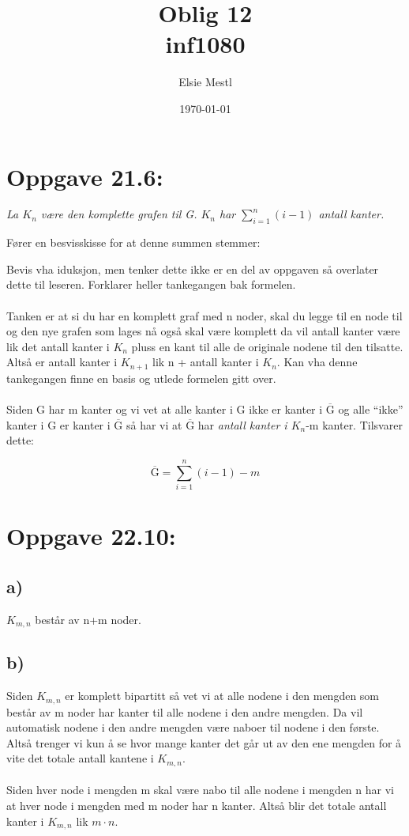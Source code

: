 \documentclass[a4paper, norsk, 10pt]{article}
\date{\today}
\title{Oblig 12 \\ inf1080}
\author{Elsie Mestl}
\begin{document}
\maketitle
\begin{flushleft}

  \section*{Oppgave 21.6:}

  
  \textit{La $K_{n}$ være den komplette grafen til G. $K_{n}$ har $\sum\limits_{i = 1}^{n} (i-1)$ antall kanter.}

  Fører en besvisskisse for at denne summen stemmer:

  Bevis vha iduksjon, men tenker dette ikke er en del av oppgaven så overlater dette til leseren. Forklarer heller tankegangen bak formelen.
\\ \ \\
  Tanken er at si du har en komplett graf med n noder, skal du legge til en node til og den nye grafen som lages nå også skal være komplett da vil antall kanter være lik det antall kanter i $K_{n}$ pluss en kant til alle de originale nodene til den tilsatte. Altså er antall kanter i $K_{n+1}$ lik n + antall kanter i $K_{n}$.
  Kan vha denne tankegangen finne en basis og utlede formelen gitt over.
\\ \ \\
Siden G har m kanter og vi vet at alle kanter i G ikke er kanter i $\overline{\text{G}}$ og alle ``ikke'' kanter i G er kanter i $\overline{\text{G}}$ så har vi at $\overline{\text{G}}$ har \textit{antall kanter i $K_{n}$}-m kanter. Tilsvarer dette:

\[\overline{\text{G}} = \sum\limits_{i = 1}^{n} (i-1) - m\]


\section*{Oppgave 22.10:}

  \subsection*{a)}
  $K_{m,n}$ består av n+m noder.
  
  \subsection*{b)}
  Siden $K_{m,n}$ er komplett bipartitt så vet vi at alle nodene i den mengden som består av m noder har kanter til alle nodene i den andre mengden. Da vil automatisk nodene i den andre mengden være naboer til nodene i den første. Altså trenger vi kun å se hvor mange kanter det går ut av den ene mengden for å vite det totale antall kantene i $K_{m,n}$.
  \\ \ \\
  Siden hver node i mengden m skal være nabo til alle nodene i mengden n har vi at hver node i mengden med m noder har n kanter. Altså blir det totale antall kanter i $K_{m,n}$ lik $m\cdot n$.
  

\end{flushleft}
\end{document}
